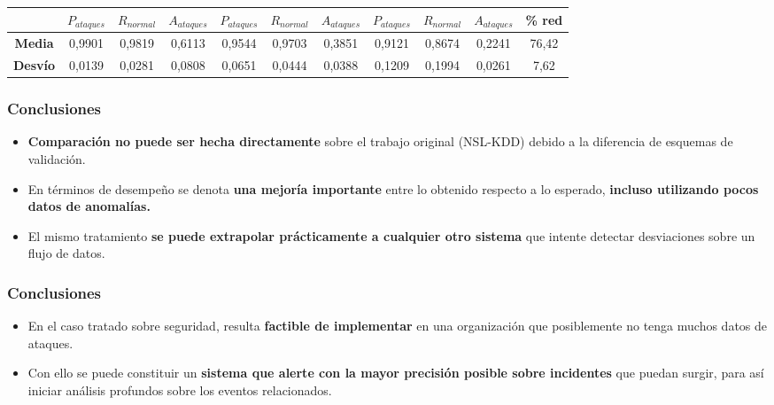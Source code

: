 \begin{frame}[t,fragile]
\begin{table}[h!]
\begin{center}
{\begin{tabular}{|c|c|c|c|c|c|c|c|c|c|c|}
					&
					$P_{ataques}$ & $R_{normal}$ & $A_{ataques}$ & 
					$P_{ataques}$ & $R_{normal}$ & $A_{ataques}$ &
					$P_{ataques}$ & $R_{normal}$ & $A_{ataques}$ &
					\% red\\
					\hline
					
					\textbf{Media} &
					0,9901  & 0,9819 & 0,6113  & 0,9544 & 0,9703 &	0,3851 &	0,9121 & 0,8674 &	0,2241  & 76,42
					
					\\
					\hline
					\textbf{Desvío} & 
					0,0139 & 0,0281	& 	0,0808 & 0,0651 & 0,0444 &	0,0388 & 0,1209 & 0,1994 & 0,0261 & 	7,62
					
					\\
					\hline
				\end{tabular}
			}
		\end{center}
	\end{table}
	
	
	
\end{frame}
\watermarkon

\watermarkoff
\begin{frame}[t,fragile]
	\frametitle {Conclusiones}

\begin{itemize}
	\item \textbf{Comparación no puede ser hecha directamente} sobre el trabajo original (NSL-KDD) debido a la diferencia de esquemas de validación.
	
	\item En términos de desempeño se denota \textbf{una mejoría importante} entre lo obtenido respecto a lo esperado, \textbf{incluso utilizando pocos datos de anomalías.}
	
	\item El mismo tratamiento \textbf{se puede extrapolar prácticamente a cualquier otro sistema} que intente detectar desviaciones sobre un flujo de datos.
\end{itemize}

\end{frame}

\begin{frame}[t,fragile]
	\frametitle {Conclusiones}
	
	\begin{itemize}
		\item En el caso tratado sobre seguridad, resulta \textbf{factible de implementar} en una organización que posiblemente no tenga muchos datos de ataques.
		
		\item Con ello se puede constituir un \textbf{sistema que alerte con la mayor precisión posible sobre incidentes} que puedan surgir, para así iniciar análisis profundos sobre los eventos relacionados.
	
	\end{itemize}
	
\end{frame}
\watermarkon


